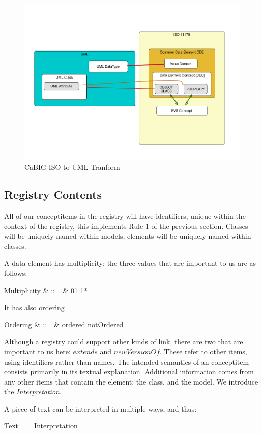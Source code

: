 \documentclass{llncs}
\def\optional{0{\upto}1}
\def\mandatory{1{\upto} 1}
\def\many{0{\upto}*}
\begin{document}
\begin{figure}[h]
\includegraphics[width=1.0\textwidth,natwidth=610,natheight=642]{ISOUMLTransform}
\caption{CaBIG ISO to UML Tranform} 
\label{fig:mapping}
\end{figure}



\subsection{Registry Contents}



All of our conceptitems in the registry will have identifiers, unique within the context of the registry, this implements Rule 1 of the previous section.  Classes will be uniquely named within models, elements will be uniquely named within classes.  
\begin{zed}
  [Id, Name]
\end{zed}

A data element has multiplicity: the three values that are important
to us are as follows:
\begin{syntax}
  Multiplicity & ::= & \optional \mid \mandatory \mid \many 
\end{syntax}

It has also ordering 
\begin{syntax}
  Ordering & ::= & ordered \mid notOrdered 
\end{syntax}

Although a registry could support other kinds of link, there are two that are important to us here: $extends$ and $newVersionOf$. These refer to other items, using identifiers rather than names. The intended semantics of an conceptitem consists primarily in its textual explanation.  Additional information comes from any other items that contain the element: the class, and the model. We introduce the \emph{Interpretation}.
\begin{zed}
  [Interpretation]
\end{zed}
A piece of text can be interpreted in multiple ways, and thus: 
\begin{zed}
  Text == \power Interpretation
\end{zed}
\end{document}
